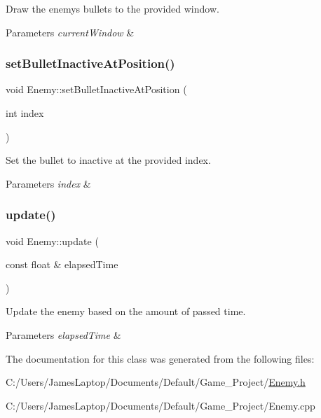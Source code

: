 Draw the enemy\textquotesingle{}s bullets to the provided window. 


\begin{DoxyParams}{Parameters}
{\em current\+Window} & \\
\hline
\end{DoxyParams}
\mbox{\label{class_enemy_a02e1cacf8fad39bbcc28271a53637024}} 
\subsubsection{\texorpdfstring{set\+Bullet\+Inactive\+At\+Position()}{setBulletInactiveAtPosition()}}
{\footnotesize\ttfamily void Enemy\+::set\+Bullet\+Inactive\+At\+Position (\begin{DoxyParamCaption}\item[{int}]{index }\end{DoxyParamCaption})}



Set the bullet to inactive at the provided index. 


\begin{DoxyParams}{Parameters}
{\em index} & \\
\hline
\end{DoxyParams}
\mbox{\label{class_enemy_a541b72a32e4a0217d58d1ee573c2f23a}} 
\subsubsection{\texorpdfstring{update()}{update()}}
{\footnotesize\ttfamily void Enemy\+::update (\begin{DoxyParamCaption}\item[{const float \&}]{elapsed\+Time }\end{DoxyParamCaption})}



Update the enemy based on the amount of passed time. 


\begin{DoxyParams}{Parameters}
{\em elapsed\+Time} & \\
\hline
\end{DoxyParams}


The documentation for this class was generated from the following files\+:\begin{DoxyCompactItemize}
\item 
C\+:/\+Users/\+James\+Laptop/\+Documents/\+Default/\+Game\+\_\+\+Project/\hyperlink{_enemy_8h}{Enemy.\+h}\item 
C\+:/\+Users/\+James\+Laptop/\+Documents/\+Default/\+Game\+\_\+\+Project/Enemy.\+cpp\end{DoxyCompactItemize}
